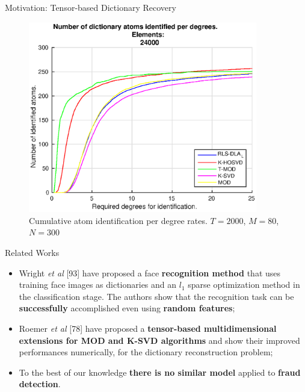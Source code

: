 \documentclass[newPxFont, numfooter, sectionpages]{beamer}
\begin{document}
\begin{frame}[c]{Motivation: Tensor-based Dictionary Recovery}
	\begin{figure}[!htb]
		\centering 
		\includegraphics[width=10cm]{../figures/ch4/5_20_2000_24000_100.eps}
		\caption{Cumulative atom identification per degree rates. $T=2000$, $M=80$, $N=300$}
		\label{fig:fig2}
	\end{figure}
\end{frame}
\begin{frame}[c]{Related Works}

	\begin{itemize}
		\item Wright \emph{et al} [93] have proposed a face \textbf{recognition method} that uses training face images as dictionaries and an $l_1$ sparse optimization method in the classification stage. The authors show that the recognition task can be \textbf{successfully} accomplished even using \textbf{random features};
		\item Roemer \emph{et al} [78] have proposed a \textbf{tensor-based multidimensional extensions for MOD and K-SVD algorithms} and show their improved performances numerically, for the dictionary reconstruction problem;
		\item To the best of our knowledge \textbf{there is no similar model} applied to \textbf{fraud detection}.
	\end{itemize}

\end{frame}
\end{document}
